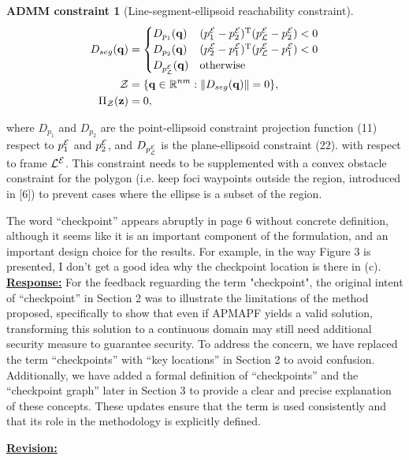\documentclass{article}
\newtheorem{constraint}{ADMM constraint}
\newcommand{\re}{\tcblower \underline{\textbf{Response:}}}
\newcommand{\rv}{{\large{\underline{\textbf{Revision:}}}}\quad}
\begin{document}
{\begin{constraint}[Line-segment-ellipsoid reachability constraint]
\begin{align}
D_{seg}(\mathbf{q}) &=  \begin{cases}
D_{p_{1}}(\mathbf{q}) & ({p_1^{\mathcal{E}}}-{p_2^{\mathcal{E}}})^\mathrm{T} ({p_{\mathcal{L}}^{\mathcal{E}}}-{p_2^{\mathcal{E}}})<0\\
D_{p_{2}}(\mathbf{q}) & ({p_2^{\mathcal{E}}}-{p_1^{\mathcal{E}}})^\mathrm{T} ({p_{\mathcal{L}}^{\mathcal{E}}} -{p_1^{\mathcal{E}}})<0\\
D_{p_{\mathcal{L}}^{\mathcal{E}}}(\mathbf{q}) & \textrm{otherwise}
\end{cases} \label{eq:segment_ellipsoid_constraint}\\
  \mathcal{Z} &= \{\mathbf{q}\in\mathbb{R}^{nm}:\lVert D_{seg}(\mathbf{q})\rVert = 0 \},\\
   \Pi_{\mathcal{Z}}(\mathbf{z}) & = 0, 
\end{align}
\end{constraint}
where $D_{p_{1}}$ and $D_{p_{2}}$ are the point-ellipsoid constraint projection function (11) respect to ${p_{1}^{\mathcal{E}}}$ and ${p_{2}^{\mathcal{E}}}$, and $D_{p_{\mathcal{L}}^{\mathcal{E}}}$ is the plane-ellipsoid constraint (22). with respect to frame ${\mathcal{L}^{\mathcal{E}}}$.
This constraint needs to be supplemented with a convex obstacle constraint for the polygon (i.e. keep foci waypoints outside the region, introduced in [6]) to prevent cases where the ellipse is a subset of the region.
}

\vspace{0.2cm}
\begin{cmt}{}{}
	The word “checkpoint” appears abruptly in page 6 without concrete
	definition, although it seems like it is an important component of the
	formulation, and an important design choice for the results. For
	example, in the way Figure 3 is presented, I don't get a good idea why
	the checkpoint location is there in (c). 
	\re 
	\noindent
 For the feedback reguarding the term "checkpoint", the original intent of “checkpoint” in Section 2 was to illustrate the limitations of the method proposed, specifically to show that even if APMAPF yields a valid solution, transforming this solution to a continuous domain may still need additional security measure to guarantee security. To address the concern, we have replaced the term “checkpoints” with “key locations” in Section 2 to avoid confusion. Additionally, we have added a formal definition of “checkpoints” and the “checkpoint graph” later in Section 3 to provide a clear and precise explanation of these concepts. These updates ensure that the term is used consistently and that its role in the methodology is explicitly defined. 
\end{cmt}
\rv
\renewcommand\thesubsection{H}
\end{document}
